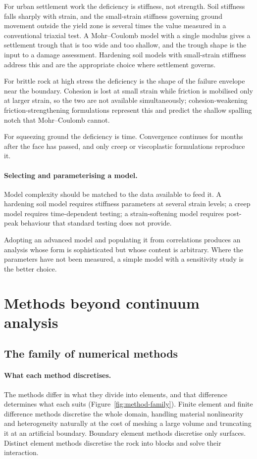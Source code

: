 For urban settlement work the deficiency is stiffness, not strength. Soil
stiffness falls sharply with strain, and the small-strain stiffness governing
ground movement outside the yield zone is several times the value measured in
a conventional triaxial test. A Mohr--Coulomb model with a single modulus
gives a settlement trough that is too wide and too shallow, and the trough
shape is the input to a damage assessment. Hardening soil models with
small-strain stiffness address this and are the appropriate choice where
settlement governs.

For brittle rock at high stress the deficiency is the shape of the failure
envelope near the boundary. Cohesion is lost at small strain while friction is
mobilised only at larger strain, so the two are not available simultaneously;
cohesion-weakening friction-strengthening formulations represent this and
predict the shallow spalling notch that Mohr--Coulomb cannot.

For squeezing ground the deficiency is time. Convergence continues for months
after the face has passed, and only creep or viscoplastic formulations
reproduce it.

\paragraph{Selecting and parameterising a model.}
Model complexity should be matched to the data available to feed it. A
hardening soil model requires stiffness parameters at several strain levels; a
creep model requires time-dependent testing; a strain-softening model requires
post-peak behaviour that standard testing does not provide.

Adopting an advanced model and populating it from correlations produces an
analysis whose form is sophisticated but whose content is arbitrary. Where the
parameters have not been measured, a simple model with a sensitivity
study is the better choice.

\section{Methods beyond continuum analysis}
\label{sec:beyond-continuum}

\subsection{The family of numerical methods}
\label{sec:numerical-family}

\paragraph{What each method discretises.}
The methods differ in what they divide into elements, and that difference
determines what each suits (Figure~\ref{fig:method-family}). Finite element and finite difference methods
discretise the whole domain, handling material nonlinearity and heterogeneity
naturally at the cost of meshing a large volume and truncating it at an
artificial boundary. Boundary element methods discretise only surfaces.
Distinct element methods discretise the rock into blocks and solve their
interaction.

